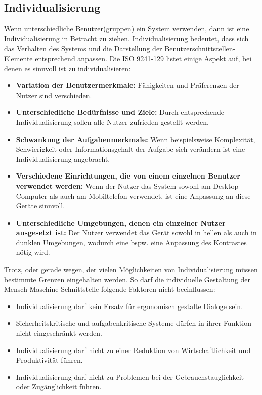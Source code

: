 \subsection{Individualisierung}
\label{2:Individualisierung}
Wenn unterschiedliche Benutzer(gruppen) ein System verwenden, dann ist eine Individualisierung in Betracht zu ziehen. Individualisierung bedeutet, dass sich das Verhalten des Systems und die Darstellung der Benutzerschnittstellen-Elemente entsprechend anpassen. Die ISO 9241-129 \cite{ISO9241-129} listet einige Aspekt auf, bei denen es sinnvoll ist zu individualisieren:
\begin{itemize}
\item \textbf{Variation der Benutzermerkmale:} Fähigkeiten und Präferenzen der Nutzer sind verschieden.
\item \textbf{Unterschiedliche Bedürfnisse und Ziele:} Durch entsprechende Individualisierung sollen alle Nutzer zufrieden gestellt werden.
\item \textbf{Schwankung der Aufgabenmerkmale:} Wenn beispielsweise Komplexität, Schwierigkeit oder Informationsgehalt der Aufgabe sich verändern ist eine Individualisierung angebracht.
\item \textbf{Verschiedene Einrichtungen, die von einem einzelnen Benutzer verwendet werden:} Wenn der Nutzer das System sowohl am Desktop Computer als auch am Mobiltelefon verwendet, ist eine Anpassung an diese Geräte sinnvoll.
\item \textbf{Unterschiedliche Umgebungen, denen ein einzelner Nutzer ausgesetzt ist:} Der Nutzer verwendet das Gerät sowohl in hellen als auch in dunklen Umgebungen, wodurch eine bspw. eine Anpassung des Kontrastes nötig wird.
\end{itemize}
Trotz, oder gerade wegen, der vielen Möglichkeiten von Individualisierung müssen bestimmte Grenzen eingehalten werden. So darf die individuelle Gestaltung der Mensch-Maschine-Schnittstelle folgende Faktoren nicht beeinflussen:
\begin{itemize}
\item Individualisierung darf kein Ersatz für ergonomisch gestalte Dialoge sein.
\item Sicherheitskritische und aufgabenkritische Systeme dürfen in ihrer Funktion nicht eingeschränkt werden.
\item Individualisierung darf nicht zu einer Reduktion von Wirtschaftlichkeit und Produktivität führen.
\item Individualisierung darf nicht zu Problemen bei der Gebrauchstauglichkeit oder Zugänglichkeit führen.
\end{itemize}

